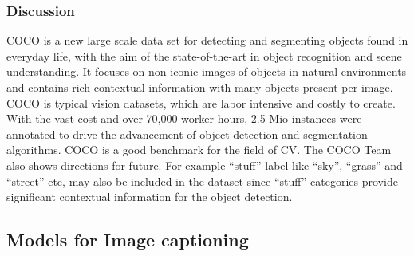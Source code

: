 \documentclass[
]{krantz}
\begin{document}
\hypertarget{discussion}{%
\subsubsection{Discussion}\label{discussion}}

COCO is a new large scale data set for detecting and segmenting objects found in everyday life, with the aim of the state-of-the-art in object recognition and scene understanding. It focuses on non-iconic images of objects in natural environments and contains rich contextual information with many objects present per image. COCO is typical vision datasets, which are labor intensive and costly to create.
With the vast cost and over 70,000 worker hours, 2.5 Mio instances were annotated to drive the advancement of object detection and segmentation algorithms. COCO is a good benchmark for the field of CV.\citep{mccoco}
The COCO Team also shows directions for future. For example ``stuff'' label like ``sky'', ``grass'' and ``street'' etc, may also be included in the dataset since ``stuff'' categories provide significant contextual information for the object detection.

\hypertarget{models-for-image-captioning}{%
\subsection{Models for Image captioning}\label{models-for-image-captioning}}
\end{document}
